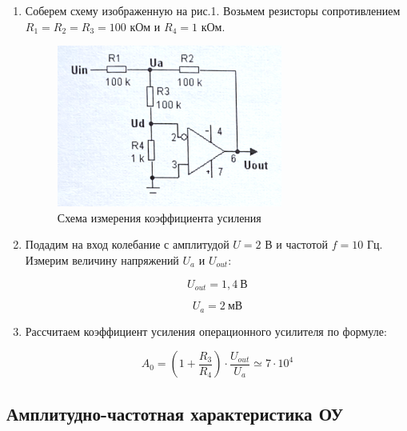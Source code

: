 \documentclass[a4paper, 12pt]{article}%
\begin{document}
\begin{enumerate}

\item Соберем схему изображенную на рис.1. Возьмем резисторы сопротивлением $R_1 = R_2 = R_3 = 100$ кОм и $R_4 = 1$ кОм.

\begin{figure}[h]
\begin{center}
\includegraphics[width = 0.7\textwidth]{scheme1.png}
\caption{Схема измерения коэффициента усиления}
\end{center}
\end{figure}

\item Подадим на вход колебание с амплитудой $U = 2$ В и частотой $f = 10$ Гц. Измерим величину напряжений $U_a$ и $U_{out}$:

\[U_{out} = 1,4 \: \text{В}\]

\[U_a = 2 \: \text{мВ}\]

\item Рассчитаем коэффициент усиления операционного усилителя по формуле:

\[A_0 = (1 + \frac{R_3}{R_4}) \cdot \frac{U_{out}}{U_a} \simeq 7 \cdot 10^4\]

\end{enumerate}

\subsection{Амплитудно-частотная характеристика ОУ}
\end{document}
